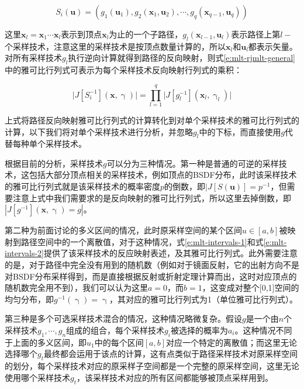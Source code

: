 \begin{equation}
	S_i({\mathbf{u}})=(g_1(\mathbf{u}_1),g_2(\mathbf{x}_1,\mathbf{u}_2),\cdots,g_q(\mathbf{x}_{q-1},\mathbf{u}_q))
\end{equation}

\noindent 这里${\mathbf{x}}_l=\mathbf{x}_1\cdots\mathbf{x}_l$表示到顶点$\mathbf{x}_l$为止的一个子路径，$g_l(\mathbf{x}_{l-1},\mathbf{u}_l)$表示路径上第$l-$个采样技术，注意这里的采样技术是按顶点数量计算的，所以$\mathbf{x}_l$和$\mathbf{u}_l$都表示矢量。对所有采样技术$g_l$执行逆向计算就得到路径的反向映射，则式\ref{e:mlt-rjmlt-general}中的雅可比行列式可表示为每个采样技术反向映射行列式的乘积：

\begin{equation}
	\big|J[S^{-1}_i]({\mathbf{x}},{\upgamma})\big|=\prod^{q}_{l=1}\big|J[g^{-1}_l](\mathbf{x}_l,\upgamma_l)\big|
\end{equation}

\noindent 上式将路径反向映射雅可比行列式的计算转化到对单个采样技术的雅可比行列式的计算，以下我们将对单个采样技术进行分析，并忽略$g_l$中的下标，而直接使用$g$代替每种单个采样技术。

根据目前的分析，采样技术$g$可以分为三种情况。第一种是普通的可逆的采样技术，这包括大部分顶点相关的采样技术，例如顶点的BSDF分布，此时该采样技术的雅可比行列式就是该采样技术的概率密度$p$的倒数，即$|J[S(\mathbf{u})]=p^{-1}$，但需要注意上式中我们需要求的是反向映射的雅可比行列式，所以这里去掉倒数，即$|J[g^{-1}](\mathbf{x},\upgamma)=g|$。

第二种为前面讨论的多义区间的情况，此时原采样空间的某个区间$u\in[a,b]$被映射到路径空间中的一个离散值，对于这种情况，式\ref{e:mlt-intervals-1}和式\ref{e:mlt-intervals-2}提供了该采样技术的反应映射表述，及其雅可比行列式。此外需要注意的是，对于路径中完全没有用到的随机数（例如对于镜面反射，它的出射方向不是对BSDF分布采样得到，而是直接根据反射或折射定理计算而出，这时对应顶点的随机数完全用不到），我们可以认为这里$a=0$，而$b=1$，这变成对整个[0,1]空间的均匀分布，即$g^{-1}(\upgamma)=\upgamma$，其对应的雅可比行列式为1（单位雅可比行列式）。

第三种是多个可选采样技术混合的情况，这种情况略微复杂。假设$g$是一个由$n$个采样技术$g_1,\cdots,g_n$组成的组合，每个采样技术$g_i$被选择的概率为$a_i$。这种情况不同于上面的多义区间，即$u_1$中的每个区间$[a,b]$对应一个特定的离散值；而这里无论选择哪个$g_t$最终都会运用于该点的计算，这有点类似于路径采样技术对原采样空间的划分，每个采样技术对应的原采样子空间都是一个完整的原采样空间，这里无论使用哪个采样技术$g_t$，该采样技术对应的所有区间都能够被顶点采样用到。


